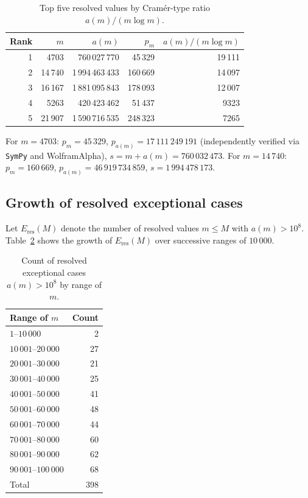 \documentclass[12pt]{article}
\begin{document}
	\begin{table}[ht]
		\centering
		\caption{Top five resolved values by Cram\'er-type ratio
			$a(m)/(m\log m)$.}
		\label{tab:ratio}
		\begin{tabular}{rrrrr}
			\toprule
			Rank & $m$ & $a(m)$ & $p_m$ & $a(m)/(m\log m)$ \\
			\midrule
			1 &  4703 &  760\,027\,770 &  45\,329 & 19\,111 \\
			2 & 14\,740 & 1\,994\,463\,433 & 160\,669 & 14\,097 \\
			3 & 16\,167 & 1\,881\,095\,843 & 178\,093 & 12\,007 \\
			4 &  5263 &  420\,423\,462 &  51\,437 &  9323 \\
			5 & 21\,907 & 1\,590\,716\,535 & 248\,323 &  7265 \\
			\bottomrule
		\end{tabular}
	\end{table}
	
	For $m = 4703$: $p_m = 45\,329$,
	$p_{a(m)} = 17\,111\,249\,191$ (independently verified via \texttt{SymPy}
	and WolframAlpha),
	$s = m + a(m) = 760\,032\,473$.
	For $m = 14\,740$: $p_m = 160\,669$,
	$p_{a(m)} = 46\,919\,734\,859$,
	$s = 1\,994\,478\,173$.
	
	\subsection{Growth of resolved exceptional cases}
	
	Let $E_{\mathrm{res}}(M)$ denote the number of resolved values
	$m \leq M$ with $a(m) > 10^8$.
	Table~\ref{tab:growth} shows the growth of $E_{\mathrm{res}}(M)$ over
	successive ranges of $10\,000$.
	
	\begin{table}[ht]
		\centering
		\caption{Count of resolved exceptional cases $a(m) > 10^8$
			by range of $m$.}
		\label{tab:growth}
		\begin{tabular}{lr}
			\toprule
			Range of $m$ & Count \\
			\midrule
			$1$--$10\,000$   &   2 \\
			$10\,001$--$20\,000$ &  27 \\
			$20\,001$--$30\,000$ &  21 \\
			$30\,001$--$40\,000$ &  25 \\
			$40\,001$--$50\,000$ &  41 \\
			$50\,001$--$60\,000$ &  48 \\
			$60\,001$--$70\,000$ &  44 \\
			$70\,001$--$80\,000$ &  60 \\
			$80\,001$--$90\,000$ &  62 \\
			$90\,001$--$100\,000$ &  68 \\
			\midrule
			Total & 398 \\
			\bottomrule
		\end{tabular}
	\end{table}
	
\end{document}

